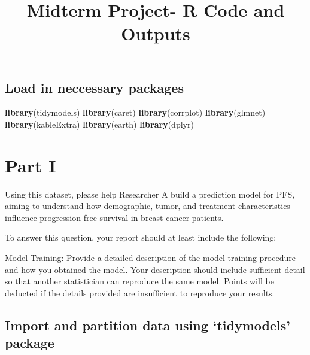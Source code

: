 \documentclass[
]{article}
\title{Midterm Project- R Code and Outputs}
\author{}
\date{\vspace{-2.5em}}
\newenvironment{Shaded}{\begin{snugshade}}{\end{snugshade}}
\newcommand{\FunctionTok}[1]{\textcolor[rgb]{0.13,0.29,0.53}{\textbf{#1}}}
\newcommand{\NormalTok}[1]{#1}
\begin{document}
\maketitle

\subsection{Load in neccessary
packages}\label{load-in-neccessary-packages}

\begin{Shaded}
\begin{Highlighting}[]
\FunctionTok{library}\NormalTok{(tidymodels)}
\FunctionTok{library}\NormalTok{(caret)}
\FunctionTok{library}\NormalTok{(corrplot)}
\FunctionTok{library}\NormalTok{(glmnet)}
\FunctionTok{library}\NormalTok{(kableExtra)}
\FunctionTok{library}\NormalTok{(earth)}
\FunctionTok{library}\NormalTok{(dplyr)}
\end{Highlighting}
\end{Shaded}

\section{Part I}\label{part-i}

Using this dataset, please help Researcher A build a prediction model
for PFS, aiming to understand how demographic, tumor, and treatment
characteristics influence progression-free survival in breast cancer
patients.

To answer this question, your report should at least include the
following:

Model Training: Provide a detailed description of the model training
procedure and how you obtained the model. Your description should
include sufficient detail so that another statistician can reproduce the
same model. Points will be deducted if the details provided are
insufficient to reproduce your results.

\subsection{Import and partition data using `tidymodels'
package}\label{import-and-partition-data-using-tidymodels-package}
\end{document}
